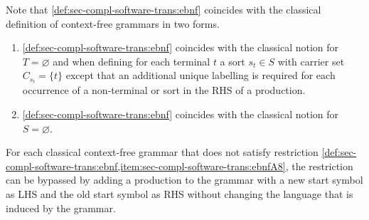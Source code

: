 \begin{remark}
\label{rem:sec-compl-software-trans:ebnf}
Note that \cref{def:sec-compl-software-trans:ebnf} coincides with the classical definition of context-free grammars in two forms.
\begin{enumerate}
  \item \cref{def:sec-compl-software-trans:ebnf} coincides with the classical notion for $T=\varnothing$ and when defining for each terminal $t$ a sort $s_t \in S$ with carrier set $C_{s_t}=\{t\}$ except that an additional unique labelling is required for each occurrence of a non-terminal or sort in the RHS of a production.
  \item \label{item:sec-compl-software-trans:ebnf2}\cref{def:sec-compl-software-trans:ebnf} coincides with the classical notion for $S=\varnothing$.\envEndMarker
\end{enumerate}
For each classical context-free grammar that does not satisfy restriction \cref{def:sec-compl-software-trans:ebnf,item:sec-compl-software-trans:ebnfA8}, the restriction can be bypassed by adding a production to the grammar with a new start symbol as LHS and the old start symbol as RHS without changing the language that is induced by the grammar. 
\end{remark}

